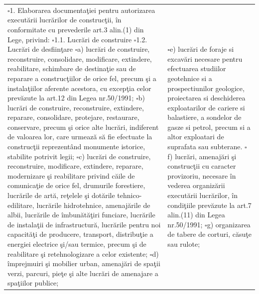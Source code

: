 \documentclass[11pt,a4paper]{article}
\newcommand{\checkboxempty}{$\square$}
\begin{document}
\vspace{0.4cm}

\begin{tabularx}{\textwidth}{|X|X|}
\hline
\checkboxempty 1. Elaborarea documentaţiei pentru autorizarea executării lucrărilor de construcţii, în conformitate cu prevederile art.3 alin.(1) din Lege, privind:\newline
\checkboxempty 1.1. Lucrări de construire\newline
\checkboxempty 1.2. Lucrări de desfiinţare\newline
\checkboxempty a) lucrări de construire, reconstruire, consolidare, modificare, extindere, reabilitare, schimbare de destinaţie sau de reparare a construcţiilor de orice fel, precum şi a instalaţiilor aferente acestora, cu excepţia celor prevăzute la art.12 din Legea nr.50/1991;\newline
\checkboxempty b) lucrări de construire, reconstruire, extindere, reparare, consolidare, protejare, restaurare, conservare, precum şi orice alte lucrări, indiferent de valoarea lor, care urmează să fie efectuate la construcţii reprezentând monumente istorice, stabilite potrivit legii;\newline
\checkboxempty c) lucrări de construire, reconstruire, modificare, extindere, reparare, modernizare şi reabilitare privind căile de comunicaţie de orice fel, drumurile forestiere, lucrările de artă, reţelele şi dotările tehnico-edilitare, lucrările hidrotehnice, amenajările de albii, lucrările de îmbunătăţiri funciare, lucrările de instalaţii de infrastructură, lucrările pentru noi capacităţi de producere, transport, distribuţie a energiei electrice şi/sau termice, precum şi de reabilitare şi retehnologizare a celor existente;\newline
\checkboxempty d) împrejmuiri şi mobilier urban, amenajări de spaţii verzi, parcuri, pieţe şi alte lucrări de amenajare a spaţiilor publice;
&
\checkboxempty e) lucrări de foraje si excavări necesare pentru efectuarea studiilor geotehnice si a prospectiunilor geologice, proiectarea si deschiderea exploatarilor de cariere si balastiere, a sondelor de gasze si petrol, precum si a altor exploatari de suprafata sau subterane.\newline
\checkboxempty f) lucrări, amenajări şi construcţii cu caracter provizoriu, necesare în vederea organizării executării lucrărilor, în condiţiile prevăzute la art.7 alin.(11) din Legea nr.50/1991;\newline
\checkboxempty g) organizarea de tabere de corturi, căsuţe sau rulote;\newline

\end{tabularx}
\end{document}
